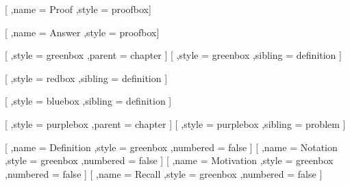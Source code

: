 [
    ,name = Proof
    ,style = proofbox]
\renewenvironment{proof}
{\vspace{-\vlengthBetweenColoredBoxes}\begin{proof*}}{\end{proof*}}

[
    ,name = Answer
    ,style = proofbox]
\newenvironment{answer}
{\vspace{-\vlengthBetweenColoredBoxes}\begin{answer*}}{\end{answer*}}

        [
            ,style = greenbox
            ,parent = chapter
        ]
        [
            ,style = greenbox
            ,sibling = definition
        ]

        [
            ,style = redbox
            ,sibling = definition
        ]

        [
            ,style = bluebox
            ,sibling = definition
        ]

        [
            ,style = purplebox
            ,parent = chapter
        ]
        [
            ,style = purplebox
            ,sibling = problem
        ]

        [
            ,name = Definition
            ,style = greenbox
            ,numbered = false
        ]
        [
            ,name = Notation
            ,style = greenbox
            ,numbered = false
        ]
        [
            ,name = Motivation
            ,style = greenbox
            ,numbered = false
        ]
        [
            ,name = Recall
            ,style = greenbox
            ,numbered = false
        ]

